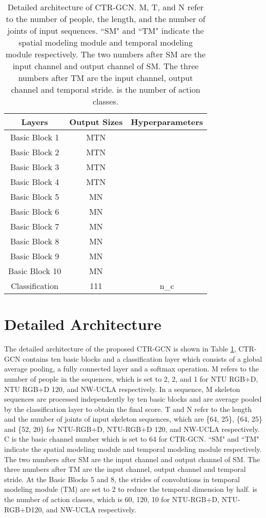 \documentclass[10pt,twocolumn,letterpaper]{article}
\begin{document}
\begin{table}[!h]
	\begin{center}
		\begin{tabular}{c|c|c}
			\hline
			Layers & Output Sizes & Hyperparameters \\
			\hline
			Basic Block 1 & MTN & \\
			\hline
			Basic Block 2& MTN & \\
			\hline
			Basic Block 3& MTN & \\
			\hline
			Basic Block 4& MTN & \\
			\hline
			Basic Block 5& MN & \\
			\hline
			Basic Block 6& MN & \\
			\hline
			Basic Block 7& MN & \\
			\hline
			Basic Block 8& MN & \\
			\hline
			Basic Block 9& MN & \\
			\hline
			Basic Block 10& MN & \\
			\hline
			Classification& 111 & n_c\\
			\hline
		\end{tabular}
	\end{center}
\caption{Detailed architecture of CTR-GCN. M, T, and N refer to the number of people, the length, and the number of joints of input sequences. ``SM" and ``TM" indicate the spatial modeling module and temporal modeling module respectively. The two numbers after SM are the input channel and output channel of SM. The three numbers after TM are the input channel, output channel and temporal stride.  is the number of action classes.}
	\label{tab:archi}
\end{table}



\section*{Detailed Architecture}

The detailed architecture of the proposed CTR-GCN is shown in Table \ref{tab:archi}, CTR-GCN contains ten basic blocks and a classification layer which consists of a global average pooling, a fully connected layer and a softmax operation. M refers to the number of people in the sequences, which is set to 2, 2, and 1 for NTU RGB+D, NTU RGB+D 120, and NW-UCLA respectively. In a sequence, M skeleton sequences are processed independently by ten basic blocks and are average pooled by the classification layer to obtain the final score. T and N refer to the length and the number of joints of input skeleton sequences, which are \{64, 25\}, \{64, 25\} and \{52, 20\} for NTU-RGB+D, NTU-RGB+D 120, and NW-UCLA respectively. C is the basic channel number which is set to 64 for CTR-GCN. ``SM" and ``TM" indicate the spatial modeling module and temporal modeling module respectively. The two numbers after SM are the input channel and output channel of SM. The three numbers after TM are the input channel, output channel and temporal stride. At the Basic Blocks 5 and 8, the strides of convolutions in temporal modeling module (TM) are set to 2 to reduce the temporal dimension by half.  is the number of action classes, which is 60, 120, 10 for NTU-RGB+D, NTU-RGB+D120, and NW-UCLA respectively. 
\end{document}
